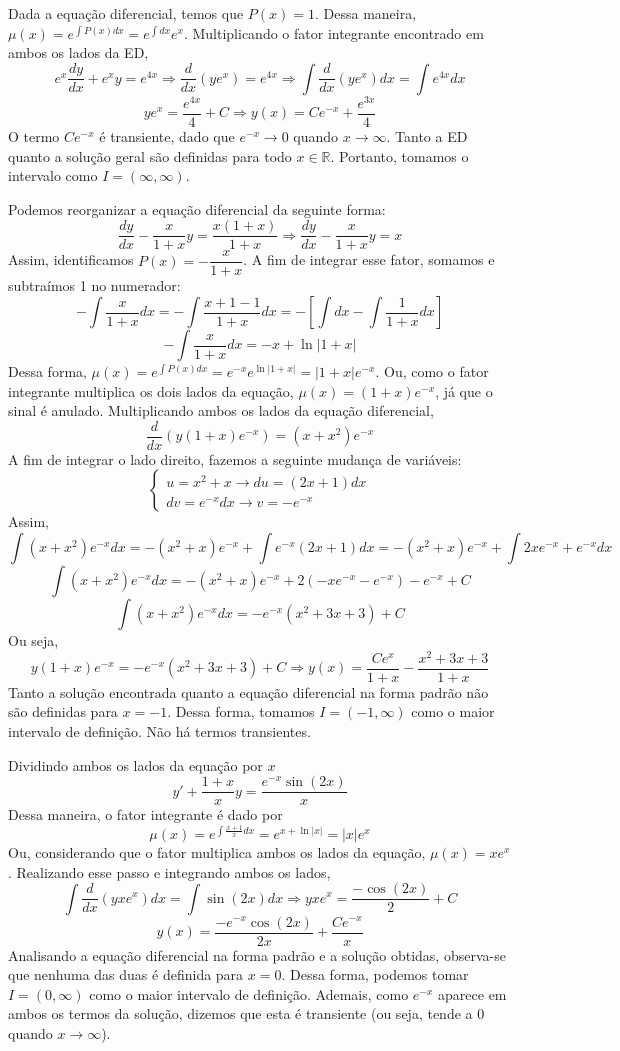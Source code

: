 \documentclass[oneside,12pt,a4paper]{report}
\begin{document}
    \begin{resolucao}
        \itemresolucao Dada a equação diferencial, temos que $P(x)=1$. Dessa maneira, $\mu(x)=e^{\int P(x)dx}=e^{\int dx}e^{x}$. Multiplicando o fator integrante encontrado em ambos os lados da ED,
        \[e^x\frac{dy}{dx}+e^xy=e^{4x}\Rightarrow \frac{d}{dx}(ye^x)=e^{4x}\Rightarrow \int\frac{d}{dx}(ye^x)dx=\int e^{4x}dx\]
        \[ye^x=\frac{e^{4x}}{4}+C\Rightarrow \boxed{y(x)=Ce^{-x}+\frac{e^{3x}}{4}}\]
        O termo $Ce^{-x}$ é transiente, dado que $e^{-x}\to0$ quando $x\to\infty$. Tanto a ED quanto a solução geral são definidas para todo $x\in\mathbb{R}$. Portanto, tomamos o intervalo como $I=(\infty, \infty)$.

        \itemresolucao Podemos reorganizar a equação diferencial da seguinte forma:
        \[\frac{dy}{dx}-\frac{x}{1+x}y=\frac{x(1+x)}{1+x}\Rightarrow\frac{dy}{dx}-\frac{x}{1+x}y=x\]
        Assim, identificamos $P(x)=-\dfrac{x}{1+x}$. A fim de integrar esse fator, somamos e subtraímos 1 no numerador:
        \[-\int\frac{x}{1+x}dx=-\int\frac{x+1-1}{1+x}dx=-\left[\int dx-\int\frac{1}{1+x}dx\right]\]
        \[-\int\frac{x}{1+x}dx=-x+\ln|1+x|\]
        Dessa forma, $\mu(x)=e^{\int P(x)dx}=e^{-x}e^{\ln|1+x|}=|1+x|e^{-x}$. Ou, como o fator integrante multiplica os dois lados da equação, $\mu(x)=(1+x)e^{-x}$, já que o sinal é anulado. Multiplicando ambos os lados da equação diferencial,
        \[\frac{d}{dx}(y(1+x)e^{-x})=(x+x^2)e^{-x}\]
        A fim de integrar o lado direito, fazemos a seguinte mudança de variáveis:
        \[\begin{cases}
            u=x^2+x\rightarrow du=(2x+1)dx\\
            dv=e^{-x}dx\rightarrow v=-e^{-x}
        \end{cases}\]
        Assim,
        \[\int (x+x^2)e^{-x}dx=-(x^2+x)e^{-x}+\int e^{-x}(2x+1)dx=-(x^2+x)e^{-x}+\int 2xe^{-x}+e^{-x}dx\]
        \[\int (x+x^2)e^{-x}dx=-(x^2+x)e^{-x}+2(-xe^{-x}-e^{-x})-e^{-x}+C\]
        \[\int (x+x^2)e^{-x}dx=-e^{-x}(x^2+3x+3)+C\]
        Ou seja,
        \[y(1+x)e^{-x}=-e^{-x}(x^2+3x+3)+C\Rightarrow \boxed{y(x)=\frac{Ce^{x}}{1+x}-\frac{x^2+3x+3}{1+x}}\]
        Tanto a solução encontrada quanto a equação diferencial na forma padrão não são definidas para $x=-1$. Dessa forma, tomamos $I=(-1,\infty)$ como o maior intervalo de definição. Não há termos transientes.

        \itemresolucao Dividindo ambos os lados da equação por $x$
        \[y'+\frac{1+x}{x}y=\frac{e^{-x}\sin(2x)}{x}\]
        Dessa maneira, o fator integrante é dado por
        \[\mu(x)=e^{\int \frac{x+1}{x}dx}=e^{x+\ln|x|}=|x|e^x\]
        Ou, considerando que o fator multiplica ambos os lados da equação, $\mu(x)=xe^x$. Realizando esse passo e integrando ambos os lados,
        \[\int\frac{d}{dx}(yxe^x)dx=\int\sin(2x)dx\Rightarrow yxe^x=\frac{-\cos(2x)}{2}+C\]
        \[\boxed{y(x)=\frac{-e^{-x}\cos(2x)}{2x}+\frac{Ce^{-x}}{x}}\]
        Analisando a equação diferencial na forma padrão e a solução obtidas, observa-se que nenhuma das duas é definida para $x=0$. Dessa forma, podemos tomar $I=(0, \infty)$ como o maior intervalo de definição. Ademais, como $e^{-x}$ aparece em ambos os termos da solução, dizemos que esta é transiente (ou seja, tende a $0$ quando $x\to\infty$).


\end{resolucao}
\end{document}

